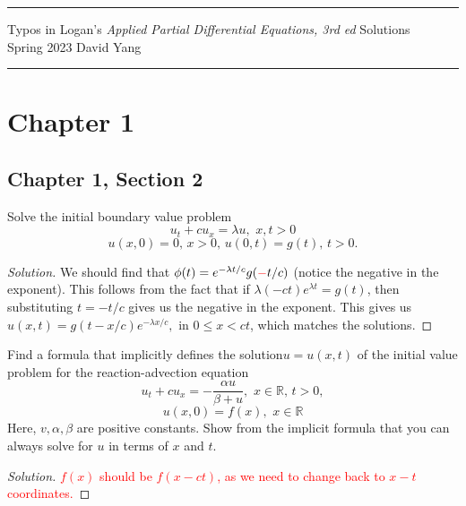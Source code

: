 \documentclass[11pt]{article}
\newenvironment{solution}
  {\renewcommand\qedsymbol{$\blacksquare$}\begin{proof}[Solution]}
  {\end{proof}}
\begin{document}
	\hrule
	\begin{center}
		{\Large Typos in Logan's \textit{Applied Partial Differential Equations, 3rd ed} Solutions } \\ %
		\vspace{0.2cm}
		Spring 2023 \hfill David Yang%
	\end{center}

\hrule

\vspace{1em}

\section{Chapter 1}
\setcounter{subsection}{1}
\subsection{Chapter 1, Section 2}
\begin{exercise}{7} Solve the initial boundary value problem \[u_t+cu_x = \lambda u, \, \, x, t > 0 \]
\[u(x,0)=0, \, x>0, \, u(0,t)=g(t), \, t > 0.\]
\end{exercise}

\begin{solution}
We should find that $\phi(t) = e^{-\lambda t/c} g(\textcolor{red}{-}t/c)$ (notice the negative in the exponent). This follows from the fact that if $\lambda(-ct)e^{\lambda t} = g(t)$, then substituting $t = -t/c$ gives us the negative in the exponent.
This gives us $u(x, t) = g(t-x/c)e^{-\lambda x/c},$ in $0 \leq x < ct$, which matches the solutions.
\end{solution}

\begin{exercise}{12} Find a formula that implicitly defines the solution$ u = u(x, t)$ of the initial value problem for the reaction-advection equation
\[ u_t + cu_x = -\frac{\alpha u}{\beta + u}, \, \, x \in \mathbb{R}, \, t > 0, \] 
\[ u(x,0) = f(x), \, \, x \in \mathbb{R} \]
  Here, $v, \alpha, \beta$ are positive constants. Show from the implicit formula that you can always solve for $u$ in terms of $x$ and $t$.
  \end{exercise}
  
  \begin{solution}
  \textcolor{red}{$f(x)$ should be $f(x-ct)$, as we need to change back to $x-t$ coordinates.}
  \end{solution}
\end{document}

